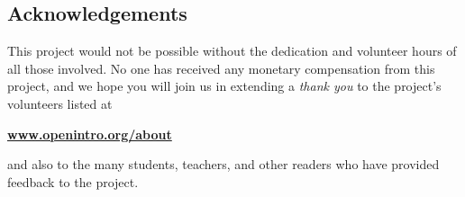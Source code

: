 \subsection*{Acknowledgements}

This project would not be possible without the dedication and volunteer hours of all those involved. No one has received any monetary compensation from this project, and we hope you will join us in extending a \emph{thank you} to the project's volunteers listed at
\begin{center}
\href{http://www.openintro.org/about}{\color{black}\textbf{www.openintro.org/about}}
\end{center}
and also to the many students, teachers, and other readers who have provided feedback to the project.

